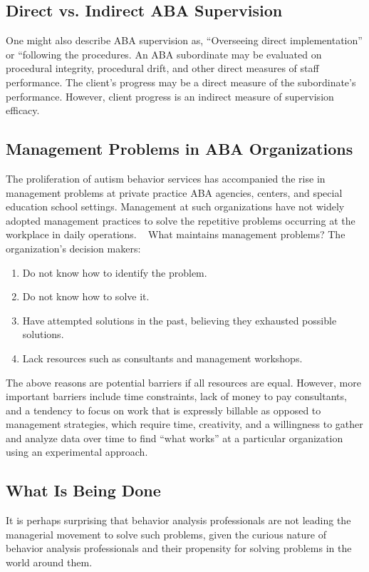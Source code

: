 \subsection{Direct vs. Indirect ABA Supervision}
One might also describe ABA supervision as, ``Overseeing direct implementation'' or ``following the procedures. An ABA subordinate may be evaluated on procedural integrity, procedural drift, and other direct measures of staff performance. The client's progress may be a direct measure of the subordinate's performance. However, client progress is an indirect measure of supervision efficacy. 
 
\subsection{Management Problems in ABA Organizations}
The proliferation of autism behavior services has accompanied the rise in management problems at private practice ABA agencies, centers, and special education school settings. Management at such organizations have not widely adopted management practices to solve the repetitive problems occurring at the workplace in daily operations. 
 
What maintains management problems? The organization's decision makers: 
\begin{enumerate}
\item Do not know how to identify the problem.
\item Do not know how to solve it.
\item Have attempted solutions in the past, believing they exhausted possible solutions.
\item Lack resources such as consultants and management workshops.
\end{enumerate}

The above reasons are potential barriers if all resources are equal. However, more important barriers include time constraints, lack of money to pay consultants, and a tendency to focus on work that is expressly billable as opposed to management strategies, which require time, creativity, and a willingness to gather and analyze data over time to find ``what works'' at a particular organization using an experimental approach. 
 
\subsection{What Is Being Done}
It is perhaps surprising that behavior analysis professionals are not leading the managerial movement to solve such problems, given the curious nature of behavior analysis professionals and their propensity for solving problems in the world around them.

